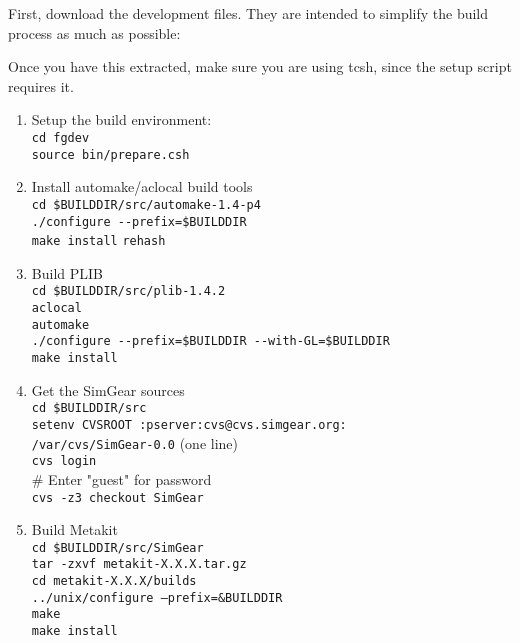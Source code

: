 First, download the development files. They are intended to simplify
the build process as much as possible:
\medskip

\medskip

Once you have this extracted, make sure you are using tcsh, since the 
setup script requires it.

\begin{enumerate}
\item Setup the build environment:\\
 \texttt{cd fgdev}\\
 \texttt{source bin/prepare.csh}

\item Install automake/aclocal build tools\\
 \texttt{cd {\$}BUILDDIR/src/automake-1.4-p4}\\
 \texttt{./configure -$ $-prefix={\$}BUILDDIR}\\
 \texttt{make install}
  \texttt{rehash}

\item Build PLIB\\
 \texttt{cd {\$}BUILDDIR/src/plib-1.4.2}\\
 \texttt{aclocal}\\
 \texttt{automake}\\
 \texttt{./configure -$ $-prefix={\$}BUILDDIR -$ $-with-GL={\$}BUILDDIR}\\
 \texttt{make install}

\item Get the SimGear sources\\
 \texttt{cd {\$}BUILDDIR/src}\\
 \texttt{setenv CVSROOT :pserver:cvs@cvs.simgear.org:}\\
 \texttt{/var/cvs/SimGear-0.0} (one line)\\
 \texttt{cvs login}\\
 \# Enter "guest" for password\\
 \texttt{cvs -z3 checkout SimGear}\\

\item Build Metakit\\
 \texttt{cd {\$}BUILDDIR/src/SimGear}\\
 \texttt{tar -zxvf metakit-X.X.X.tar.gz}\\
 \texttt{cd metakit-X.X.X/builds}\\
 \texttt{../unix/configure --prefix=\&BUILDDIR}\\
 \texttt{make}\\
 \texttt{make install}\\
 

\end{enumerate}

